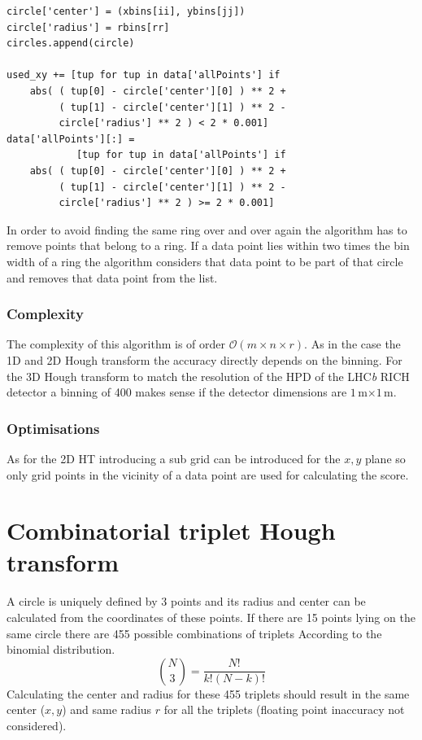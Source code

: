 \documentclass[11pt]{scrreprt}
\begin{document}
\begin{codesnippet}[htbp]
\begin{lstlisting}
circle['center'] = (xbins[ii], ybins[jj])
circle['radius'] = rbins[rr]
circles.append(circle)

used_xy += [tup for tup in data['allPoints'] if
    abs( ( tup[0] - circle['center'][0] ) ** 2 +
         ( tup[1] - circle['center'][1] ) ** 2 -
         circle['radius'] ** 2 ) < 2 * 0.001]
data['allPoints'][:] = 
            [tup for tup in data['allPoints'] if 
    abs( ( tup[0] - circle['center'][0] ) ** 2 + 
         ( tup[1] - circle['center'][1] ) ** 2 - 
         circle['radius'] ** 2 ) >= 2 * 0.001]  
\end{lstlisting}
\caption[Remove used points]{In order to avoid finding the same ring over and over again the algorithm has to remove points that
belong to a ring. If a data point lies within two times the bin width of a ring the algorithm considers that data point to be 
part of that circle and removes that data point from the list.}
\label{pc:remove_points}
\end{codesnippet}

\subsubsection{Complexity} %
\label{ssub:complexity}
The complexity of this algorithm is of order $\mathcal{O}(m\times n\times r)$. As in the case the 1D and 2D Hough transform the accuracy
directly depends on the binning. For the 3D Hough transform to match the resolution of the HPD of the LHC\textit{b} RICH detector a binning 
of 400 makes sense if the detector dimensions are $1$\,m$\times1$\,m.

\subsubsection{Optimisations} %
\label{ssub:optimisations}
As for the 2D HT introducing a sub grid can be introduced for the $x,y$ plane so only grid points in the vicinity of a data point are used
for calculating the score.

\section{Combinatorial triplet Hough transform}
\label{sec:combinatorial_approach}
A circle is uniquely defined by 3 points and its radius and center can be calculated from the coordinates of these points. If there are 
15 points lying on the same circle there are 455 possible combinations of triplets According to the binomial distribution.
\[
   \binom{N}{3} = \frac{N!}{k!(N-k)!}
 \] 
Calculating the center and radius for these 455 triplets should result in the same center ($x,y$) and same radius $r$ for all the triplets 
(floating point inaccuracy not considered). 
\end{document}
